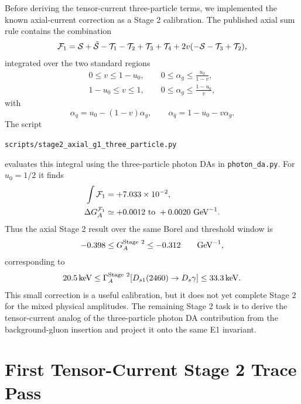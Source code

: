 \documentclass[11pt]{article}
\begin{document}
Before deriving the tensor-current three-particle terms, we implemented the
known axial-current correction as a Stage 2 calibration.  The published axial
sum rule contains the combination
\begin{equation}
  {\cal F}_1
  =
  {\cal S}+\tilde{\cal S}-{\cal T}_1-{\cal T}_2
  +{\cal T}_3+{\cal T}_4
  +2v(-{\cal S}-{\cal T}_3+{\cal T}_2),
\end{equation}
integrated over the two standard regions
\begin{align}
  0\le v\le 1-u_0,
  \qquad
  0\le \alpha_g\le \frac{u_0}{1-v},\\
  1-u_0\le v\le 1,
  \qquad
  0\le \alpha_g\le \frac{1-u_0}{v},
\end{align}
with
\begin{equation}
  \alpha_q=u_0-(1-v)\alpha_g,
  \qquad
  \alpha_{\bar q}=1-u_0-v\alpha_g .
\end{equation}
The script
\begin{center}
  \texttt{scripts/stage2\_axial\_g1\_three\_particle.py}
\end{center}
evaluates this integral using the three-particle photon DAs in
\texttt{photon\_da.py}.  For $u_0=1/2$ it finds
\begin{align}
  \int{\cal F}_1
  &=
  +7.033\times10^{-2},\\
  \Delta G_A^{{\cal F}_1}
  &\simeq
  +0.0012\text{ to }+0.0020\ \mathrm{GeV}^{-1}.
\end{align}
Thus the axial Stage 2 result over the same Borel and threshold window is
\begin{equation}
  -0.398
  \le
  G_A^{\rm Stage\ 2}
  \le
  -0.312
  \qquad \mathrm{GeV}^{-1},
\end{equation}
corresponding to
\begin{equation}
  20.5\,\mathrm{keV}
  \le
  \Gamma_A^{\rm Stage\ 2}[D_{s1}(2460)\to D_s\gamma]
  \le
  33.3\,\mathrm{keV}.
\end{equation}
This small correction is a useful calibration, but it does not yet complete
Stage 2 for the mixed physical amplitudes.  The remaining Stage 2 task is to
derive the tensor-current analog of the three-particle photon DA contribution
from the background-gluon insertion and project it onto the same E1 invariant.

\section{First Tensor-Current Stage 2 Trace Pass}
\end{document}
